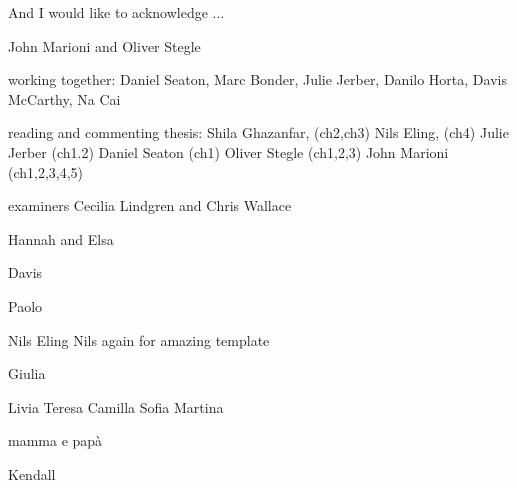 
\begin{acknowledgements}      


And I would like to acknowledge ...

John Marioni and Oliver Stegle

working together: Daniel Seaton, Marc Bonder, Julie Jerber, Danilo Horta, Davis McCarthy, Na Cai

reading and commenting thesis: 
Shila Ghazanfar, (ch2,ch3)
Nils Eling, (ch4)
Julie Jerber  (ch1.2)
Daniel Seaton (ch1)
Oliver Stegle (ch1,2,3)
John Marioni (ch1,2,3,4,5)

examiners 
Cecilia Lindgren and Chris Wallace

Hannah and Elsa

Davis 

Paolo

Nils Eling
Nils again for amazing template

Giulia

Livia Teresa Camilla Sofia Martina

mamma e papà

Kendall

\end{acknowledgements}
